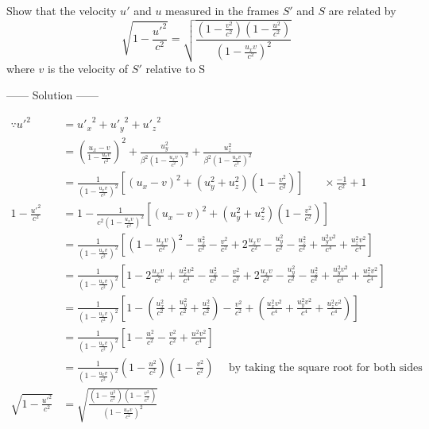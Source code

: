 \documentclass{article}
\begin{document}
\begin{example}
    Show that the velocity $u'$ and $u$ measured in the frames $S'$ and $S$ are related by 
\[
\sqrt{1-\frac{{u'}^2}{c^2}} = \sqrt{\frac{\left(1-\frac{v^2}{c^2}\right)\left(1-\frac{u^2}{c^2}\right)}{{\left(1-\frac{u_x v}{c^2}\right)}^2}}
\]
where $v$ is the velocity of $S'$ relative to S
\begin{center}
    ------ \textcolor{Solution}{Solution} ------
\end{center}
\begin{align*}
    \because {u'}^2         &= {u'_x}^2+{u'_y}^2+{u'_z}^2\\
                            &= {\left(\frac{u_x -v}{1-\frac{u_x v}{c^2}}\right)}^2 + \frac{u_y^2}{\beta^2{\left(1-\frac{u_x v}{c^2}\right)}^2} + \frac{u_z^2}{\beta^2{\left(1-\frac{u_x v}{c^2}\right)}^2}\\
                            &= \frac{1}{{\left(1-\frac{u_x v}{c^2}\right)}^2} \left[ {(u_x - v)}^2 + \left(u_y^2 + u_z^2\right)\left(1-\frac{v^2}{c^2}\right)  \right] \ \ \ \ \ \ \ \ \times\frac{-1}{c^2} + 1\\
1-\frac{{u'}^2}{c^2}        &= 1 - \frac{1}{c^2{\left(1-\frac{u_x v}{c^2}\right)}^2} \left[ {(u_x - v)}^2 + \left(u_y^2 + u_z^2\right)\left(1-\frac{v^2}{c^2}\right)  \right]\\
                            &= \frac{1}{{\left(1-\frac{u_x v}{c^2}\right)}^2} \left[ {\left(1-\frac{u_x v}{c^2}\right)}^2 - \frac{u_x^2}{c^2} - \frac{v^2}{c^2} + 2\frac{u_x v}{c^2} - \frac{u_y^2}{c^2} - \frac{u_z^2}{c^2} + \frac{u_y^2 v^2}{c^4} + \frac{u_z^2 v^2}{c^4}\right]\\
                            &= \frac{1}{{\left(1-\frac{u_x v}{c^2}\right)}^2} \left[ 1 -2\frac{u_x v}{c^2} + \frac{u_x^2 v^2}{c^4} - \frac{u_x^2}{c^2} - \frac{v^2}{c^2} + 2\frac{u_x v}{c^2} - \frac{u_y^2}{c^2} - \frac{u_z^2}{c^2} + \frac{u_y^2 v^2}{c^4} + \frac{u_z^2 v^2}{c^4}\right]\\
                            &= \frac{1}{{\left(1-\frac{u_x v}{c^2}\right)}^2} \left[ 1 -\left(\frac{u_x^2}{c^2} + \frac{u_y^2}{c^2} + \frac{u_z^2}{c^2}\right) - \frac{v^2}{c^2} +\left(\frac{u_x^2 v^2}{c^4} + \frac{u_y^2 v^2}{c^4} + \frac{u_z^2 v^2}{c^4}\right)\right]\\
                            &= \frac{1}{{\left(1-\frac{u_x v}{c^2}\right)}^2} \left[ 1 -\frac{u^2}{c^2} - \frac{v^2}{c^2} +\frac{u^2 v^2}{c^4}\right]\\
                            &= \frac{1}{{\left(1-\frac{u_x v}{c^2}\right)}^2} \left( 1 -\frac{u^2}{c^2}\right) \left(1 - \frac{v^2}{c^2}\right) \ \ \ \ \ \ \text{by taking the square root for both sides}\\
\sqrt{1-\frac{{u'}^2}{c^2}} &= \sqrt{\frac{\left( 1 -\frac{u^2}{c^2}\right) \left(1 - \frac{v^2}{c^2}\right)}{{\left(1-\frac{u_x v}{c^2}\right)}^2}}
\end{align*}
\end{example}
\end{document}

